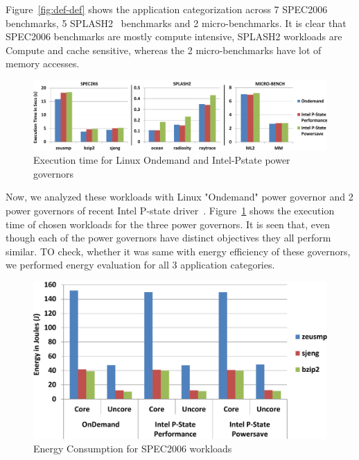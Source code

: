 Figure~\ref{fig:def-def} shows the application categorization across 7 SPEC2006~\cite{spec2006} benchmarks, 5 SPLASH2~\cite{splash2} benchmarks and 2 micro-benchmarks. 
It is clear that SPEC2006 benchmarks are mostly compute intensive, 
SPLASH2 workloads are Compute and cache sensitive, whereas the 2 micro-benchmarks 
have lot of memory accesses.

\begin{figure}[ht]
  \begin{center}
\includegraphics[width=\linewidth]{figs/def-exec-time-crop.pdf}
  \end{center}
  \vspace{-0.1in}
  \caption{Execution time for Linux Ondemand and Intel-Pstate power governors}
  \label{fig:def-perf}
\end{figure}

Now, we analyzed these workloads with Linux "Ondemand" power governor and 2 power governors of recent Intel P-state driver~\cite{pstate}. Figure~\ref{fig:def-perf}
shows the execution time of chosen workloads for the three power governors. It is seen that, even though each of the power governors
have distinct objectives they all perform similar. TO check, whether it was same with
energy efficiency of these governors, we performed energy evaluation for all 3 application categories.

\begin{figure}[h]
  \begin{center}
\includegraphics[width=\linewidth]{figs/def-drivers-spec-crop.pdf}
  \end{center}
  \vspace{-0.1in}
  \caption{Energy Consumption for SPEC2006 workloads}
  \label{fig:spec-energy}
\end{figure}

